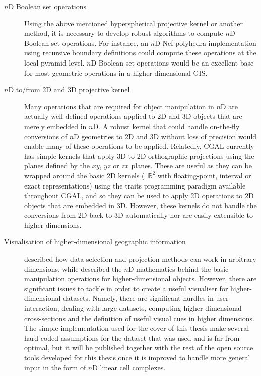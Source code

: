 \begin{description}
\item[$n$D Boolean set operations] Using the above mentioned hyperspherical projective kernel or another method, it is necessary to develop robust algorithms to compute $n$D Boolean set operations.
For instance, an $n$D Nef polyhedra implementation using recursive boundary definitions could compute these operations at the local pyramid level.
$n$D Boolean set operations would be an excellent base for most geometric operations in a higher-dimensional GIS.\@

\item[$n$D to/from 2D and 3D projective kernel] Many operations that are required for object manipulation in $n$D are actually well-defined operations applied to 2D and 3D objects that are merely embedded in $n$D.
A robust kernel that could handle on-the-fly conversions of $n$D geometries to 2D and 3D without loss of precision would enable many of these operations to be applied.
Relatedly, CGAL currently has simple kernels that apply 3D to 2D orthographic projections using the planes defined by the $xy$, $yz$ or $zx$ planes.
These are useful as they can be wrapped around the basic 2D kernels (\ie\ $\mathbb{R}^2$ with floating-point, interval or exact representations) using the traits programming paradigm available throughout CGAL, and so they can be used to apply 2D operations to 2D objects that are embedded in 3D.
However, these kernels do not handle the conversions from 2D back to 3D automatically nor are easily extensible to higher dimensions.

\item[Visualisation of higher-dimensional geographic information]  described how data selection and projection methods can work in arbitrary dimensions, while  described the $n$D mathematics behind the basic manipulation operations for higher-dimensional objects.
However, there are significant issues to tackle in order to create a useful visualiser for higher-dimensional datasets.
Namely, there are significant hurdles in user interaction, dealing with large datasets, computing higher-dimensional cross-sections and the definition of useful visual cues in higher dimensions.
The simple implementation used for the cover of this thesis make several hard-coded assumptions for the dataset that was used and is far from optimal, but it will be published together with the rest of the open source tools developed for this thesis once it is improved to handle more general input in the form of $n$D linear cell complexes.


\end{description}
